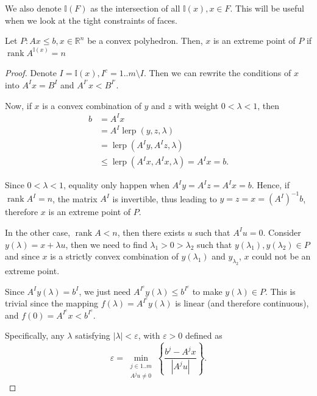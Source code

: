 We also denote \( \mathbb{I}(F) \) as the intersection of all \( \mathbb{I}(x), x \in F
\). This will be useful when we look at the tight constraints of faces.

\begin{theorem}
\label{thr:Extreme point of convex polyhedra and matrix rank}
  Let \( P: Ax \le  b, x \in \mathbb{R}^{n} \) be a convex polyhedron.
  Then, \( x \) is an extreme
  point of \( P \) if \( \operatorname{rank} A^{\mathbb{I}(x)} = n \)
\end{theorem}

\begin{proof}
  Denote \( I = \mathbb{I}(x), I^{c} = 1..m \setminus I \).
  Then we can rewrite the conditions of \( x \) into \( A^{I}x = B^{I} \) and \(
  A^{I'}x < B^{I'}\).

  Now, if \( x \) is a convex combination of \( y \) and \( z \) with weight \(
  0 < \lambda < 1\), then 
  \begin{align*}
    b &= A^{I}x\\
      &= A^{I} \operatorname{lerp}(y, z, \lambda)\\
      &= \operatorname{lerp}(A^{I}y, A^{I}z, \lambda)\\
      &\le \operatorname{lerp}(A^{I}x, A^{I}x, \lambda) = A^{I}x = b
  .\end{align*}

  Since \( 0 < \lambda < 1 \), equality only happen when \( A^{I}y = A^{I}z =
  A^{I}x = b \). Hence, if \( \operatorname{rank} A^{I} = n \), the matrix \(
  A^{I} \) is invertible, thus leading to \( y = z = x =(A^{I})^{-1} b \),
  therefore \( x \) is an extreme point of \( P \).

  In the other case, \( \operatorname{rank} A < n \), then there exists \( u \)
  such that \( A^{I}u = 0 \). Consider \( y(\lambda) = x +\lambda u \), then 
  we need to find \( \lambda_{1} > 0 > \lambda_{2} \) such that \(
  y(\lambda_{1}), y(\lambda_{2}) \in P \) and since \( x \) is a strictly convex
  combination of \( y(\lambda_{1}) \) and \( y_{\lambda_{2}} \), \( x \) could
  not be an extreme point.

  Since \( A^{I}y(\lambda) = b^{I} \), we just need \( A^{I^{c}}y(\lambda) \le
  b^{I^{c}} \) to make \( y(\lambda) \in P \). This is trivial since the mapping
  \( f(\lambda) = A^{I^{c}}y(\lambda) \) is linear (and therefore continuous),
  and \( f(0) = A^{I^{c}} x < b^{I^{c}} \).

  Specifically, any \( \lambda \) satisfying \( |\lambda| < \varepsilon \), with
  \( \varepsilon > 0 \) defined as
  \[
    \varepsilon = \min_{\substack{j \in 1..m\\ A^{j}u \neq 0}} \left\{   \frac{b^{j} - A^{j}x}{|A^{j}u|}
  \right\}  
  .\] 
\end{proof}

